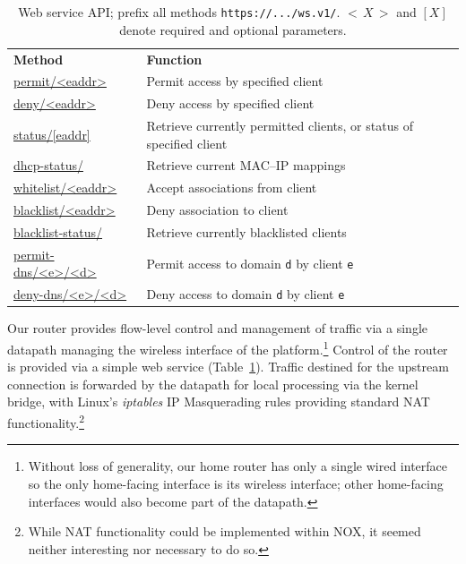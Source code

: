 \begin{table}
  \begin{tabular} {p{}p{}} 
    \textbf{Method} & \textbf{Function} \\ 
    \url{permit/<eaddr>} & Permit access by specified client\\ 
    \url{deny/<eaddr>} & Deny access by specified client\\
    \url{status/[eaddr]} & Retrieve currently permitted clients, or status of specified client \\ 
    \url{dhcp-status/} & Retrieve current MAC--IP mappings\\
    \url{whitelist/<eaddr>} & Accept associations from client\\
    \url{blacklist/<eaddr>} & Deny association to client\\
    \url{blacklist-status/} & Retrieve currently blacklisted clients\\
    \url{permit-dns/<e>/<d>} & Permit access to domain \texttt{d} by client \texttt{e}\\ 
    \url{deny-dns/<e>/<d>} & Deny access to domain \texttt{d} by client \texttt{e}\\ 
  \end{tabular} 
  \caption{\label{t:api}Web service API;
    prefix all methods \texttt{https://.../ws.v1/}.  $<$\,$X$\,$>$ and $[X]$
    denote required and optional parameters.}
\end{table}

Our router provides flow-level control and management of traffic via a single
\of datapath managing the wireless interface of the platform.\footnote{Without
  loss of generality, our home router has only a single wired interface so the
  only home-facing interface is its wireless interface; other home-facing
  interfaces would also become part of the \of datapath.} 
Control of the router is provided via a simple web service (Table~\ref{t:api}).
Traffic destined for the upstream connection is forwarded by the datapath for
local processing via the kernel bridge, with Linux's \emph{iptables} IP
Masquerading rules providing standard NAT functionality.\footnote{While NAT
  functionality could be implemented within NOX, it seemed neither interesting
  nor necessary to do so.}


